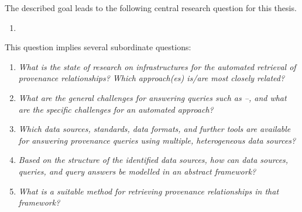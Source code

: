 The described goal leads to the following
central research question for this thesis.
%
\begin{mdframed}[
  linewidth=1pt,
  linecolor=black!50,
  innerleftmargin=0pt,innerrightmargin=0pt,
  leftline=false,rightline=false
]
  \begin{enumerate}
    \item[\RQ\phantom{\mybold{1}}]
  \end{enumerate}
\end{mdframed}
%
This question implies several subordinate questions:
%
\begin{mdframed}[
  linewidth=1pt,
  linecolor=black!50,
  innerleftmargin=0pt,innerrightmargin=0pt,
  leftline=false,rightline=false
]
  \begin{enumerate}
    \item[\subquestion{1}]
      \emph{What is the state of research on infrastructures for the automated retrieval
      of provenance relationships? Which approach(es) is/are most closely related?}
    \item[\subquestion{2}]
      \emph{What are the general challenges for answering queries such as --,
      and what are the specific challenges for an automated approach?}
    \item[\subquestion{3}]
      \emph{Which data sources, standards, data formats, and further tools
      are available for answering provenance queries using multiple, heterogeneous data sources?}
    \item[\subquestion{4}]
      \emph{Based on the structure of the identified data sources,
      how can data sources, queries, and query answers be modelled in an abstract framework?}
    \item[\subquestion{5}]
      \emph{What is a suitable method for retrieving provenance relationships
      in that framework?}
  \end{enumerate}
\end{mdframed}


